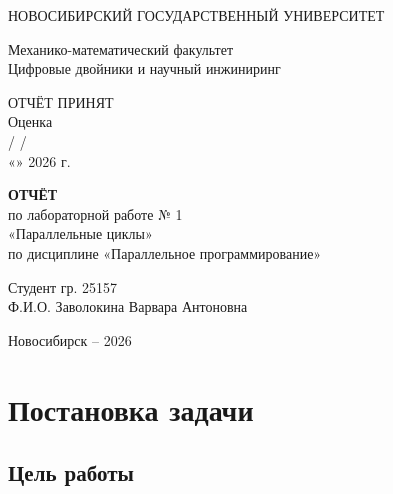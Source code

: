 \documentclass[12pt,a4paper]{article}
\begin{document}
\begin{titlepage}
\thispagestyle{empty}
\begin{center}
НОВОСИБИРСКИЙ ГОСУДАРСТВЕННЫЙ УНИВЕРСИТЕТ

\vspace{0.5cm}
Механико-математический факультет\\
Цифровые двойники и научный инжиниринг
\end{center}

\vspace{1.5cm}
\begin{flushleft}
ОТЧЁТ ПРИНЯТ\\
Оценка \underline{\hspace{4cm}}\\
\underline{\hspace{2cm}} / \underline{\hspace{3cm}} /\\
«\underline{\hspace{0.8cm}}» \underline{\hspace{3cm}} 2026 г.
\end{flushleft}

\vfill
\begin{center}
{\bfseries ОТЧЁТ}\\[0.6cm]
по лабораторной работе № 1\\[0.3cm]
«Параллельные циклы»\\[0.3cm]
по дисциплине «Параллельное программирование»
\end{center}

\vfill
\begin{flushright}
Студент гр. 25157\\
Ф.И.О. Заволокина Варвара Антоновна
\end{flushright}

\vfill
\begin{center}
Новосибирск -- 2026
\end{center}
\end{titlepage}

\setcounter{page}{2}

\section{Постановка задачи}

\subsection{Цель работы}
\end{document}
